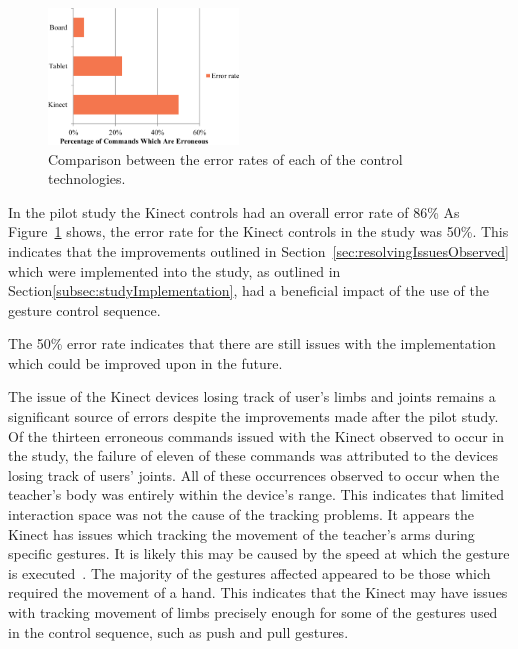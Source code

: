 \documentclass[link]{IWCOMP}
\begin{document}
\begin{figure}[h]
   \centering
   \includegraphics[width=0.45\textwidth]{figures/bar_chart_errors.png}
   \caption{Comparison between the error rates of each of the control technologies.}
   \label{fig:controlDevicesErrors}
 \end{figure}

In the pilot study the Kinect controls had an overall error rate of 86\%
As Figure~\ref{fig:controlDevicesErrors} shows, the error rate for the Kinect controls in the study was 50\%.
This indicates that the improvements outlined in Section~\ref{sec:resolvingIssuesObserved} which were implemented into the study, as outlined in Section\ref{subsec:studyImplementation}, had a beneficial impact of the use of the gesture control sequence.

The 50\% error rate indicates that there are still issues with the implementation which could be improved upon in the future.

The issue of the Kinect devices losing track of user's limbs and joints remains a significant source of errors despite the improvements made after the pilot study.
Of the thirteen erroneous commands issued with the Kinect observed to occur in the study, the failure of eleven of these commands was attributed to the devices losing track of users' joints.
All of these occurrences observed to occur when the teacher's body was entirely within the device's range.
This indicates that limited interaction space was not the cause of the tracking problems.
It appears the Kinect has issues which tracking the movement of the teacher's arms during specific gestures.
It is likely this may be caused by the speed at which the gesture is executed~\cite{Winkler2012}.
The majority of the gestures affected appeared to be those which required the movement of a hand.
This indicates that the Kinect may have issues with tracking movement of limbs precisely enough for some of the gestures used in the control sequence, such as push and pull gestures.
\end{document}
